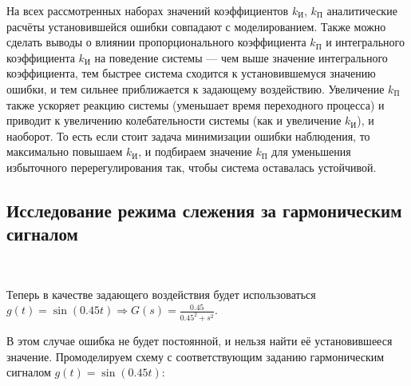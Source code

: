 \documentclass[a4paper]{article}
\begin{document}
На всех рассмотренных наборах значений коэффициентов $k_{\text{И}}$, $k_{\text{П}}$ аналитические расчёты установившейся ошибки совпадают с моделированием. Также можно сделать выводы о влиянии пропорционального коэффициента $k_{\text{П}}$ и интегрального коэффициента $k_{\text{И}}$ на поведение системы --- чем выше значение интегрального коэффициента, тем быстрее система сходится к установившемуся значению ошибки, и тем сильнее приближается к задающему воздействию. Увеличение $k_{\text{П}}$ также ускоряет реакцию системы (уменьшает время переходного процесса) и приводит к увеличению колебательности системы (как и увеличение $k_{\text{И}}$), и наоборот. То есть если стоит задача минимизации ошибки наблюдения, то максимально повышаем $k_{\text{И}}$, и подбираем значение $k_{\text{П}}$ для уменьшения избыточного перерегулирования так, чтобы система оставалась устойчивой.


\subsection{Исследование режима слежения за гармоническим сигналом}\

Теперь в качестве задающего воздействия будет использоваться $g(t) = \sin{(0.45t)} \Rightarrow G(s) = \frac{0.45}{0.45^2 + s^2}$.\

В этом случае ошибка не будет постоянной, и нельзя найти её установившееся значение. Промоделируем схему с соответствующим заданию гармоническим сигналом $g(t) = \sin{(0.45t)}$:
\end{document}
